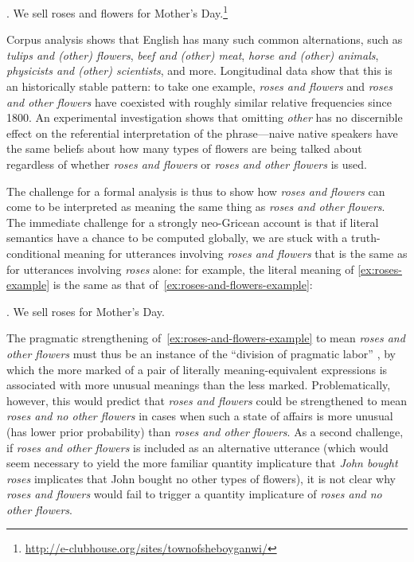 \documentclass[11pt]{article}
\begin{document}
\ex. We sell roses and flowers for Mother's
Day.\footnote{\url{http://e-clubhouse.org/sites/townofsheboyganwi/}} \label{ex:roses-and-flowers-example}

Corpus analysis shows that English has many such common alternations,
such as \emph{tulips and (other) flowers}, \emph{beef and (other)
  meat}, \emph{horse and (other) animals}, \emph{physicists and (other)
  scientists}, and more.  Longitudinal data show that this is an
historically stable pattern: to take one example, \emph{roses and
  flowers} and \emph{roses and other flowers} have coexisted with
roughly similar relative frequencies since 1800.  An experimental
investigation shows that omitting \emph{other} has no discernible
effect on the referential interpretation of the phrase---naive native
speakers have the same beliefs about how many types of flowers are
being talked about regardless of whether \emph{roses and flowers} or
\emph{roses and other flowers} is used.

The challenge for a formal analysis is thus to show how \emph{roses
  and flowers} can come to be interpreted as meaning the same thing as
\emph{roses and other flowers}.  The immediate challenge for a
strongly neo-Gricean account is that if literal semantics have a
chance to be computed globally, we are stuck with a truth-conditional
meaning for utterances involving \emph{roses and flowers} that is the
same as for utterances involving \emph{roses} alone: for example, the
literal meaning of \ref{ex:roses-example} is the same as that
of~\ref{ex:roses-and-flowers-example}:

\ex. We sell roses for Mother's Day. \label{ex:roses-example}

\noindent
The pragmatic strengthening of~\ref{ex:roses-and-flowers-example}  to mean \emph{roses and other 
  flowers} must thus be an instance of the ``division of pragmatic
labor'' \citep{horn:1984}, by which the more marked of a pair of
literally meaning-equivalent expressions is associated with more
unusual meanings than the less marked.  Problematically, however, this
would predict that \emph{roses and flowers} could be strengthened to
mean \emph{roses and no other flowers} in cases when such a state of
affairs is more unusual (has lower prior probability) than \emph{roses
  and other flowers}.  As a second challenge, if \emph{roses and other
  flowers} is included as an alternative utterance (which would seem
necessary to yield the more familiar quantity implicature that
\emph{John bought roses} implicates that John bought no other types of
flowers), it is not clear why \emph{roses and flowers} would fail to
trigger a quantity implicature of \emph{roses and no other flowers}.
\end{document}
